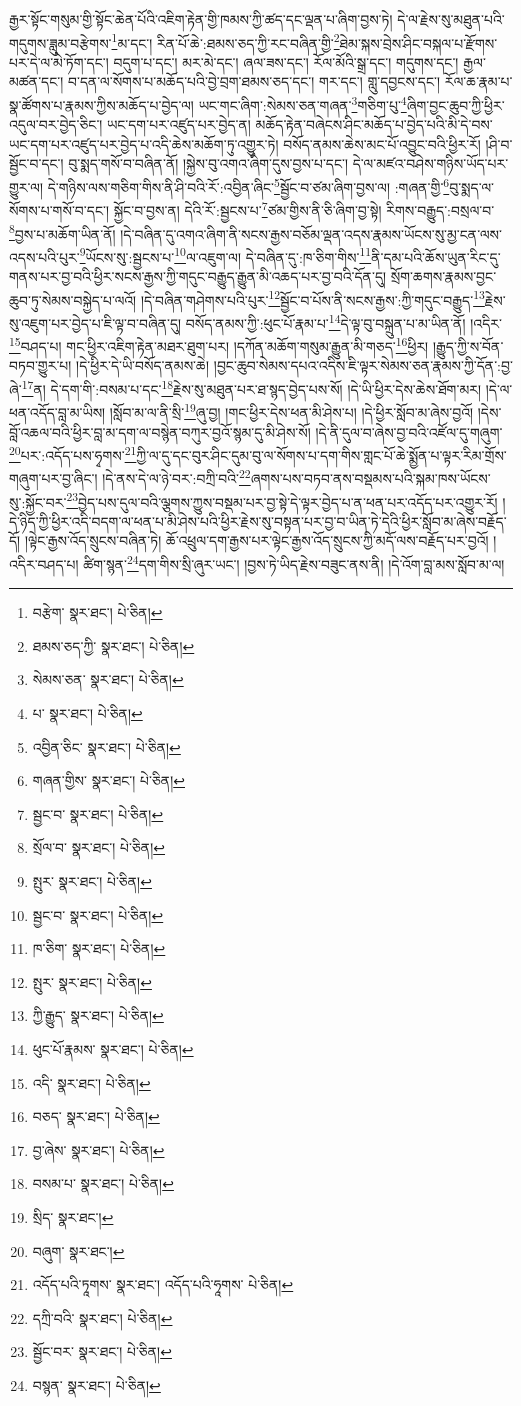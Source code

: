རྒྱར་སྟོང་གསུམ་གྱི་སྟོང་ཆེན་པོའི་འཇིག་རྟེན་གྱི་ཁམས་ཀྱི་ཚད་དང་ལྡན་པ་ཞིག་བྱས་ཏེ། དེ་ལ་རྗེས་སུ་མཐུན་པའི་གདུགས་ཟླུམ་བརྩེགས་\footnote{བརྩེག་  སྣར་ཐང་།  པེ་ཅིན། }མ་དང་། རིན་པོ་ཆེ་:ཐམས་ཅད་ཀྱི་རང་བཞིན་གྱི་\footnote{ཐམས་ཅད་ཀྱི་  སྣར་ཐང་།  པེ་ཅིན། }ཐེམ་སྐས་བྲེས་ཤིང་བསྐལ་པ་རྫོགས་པར་དེ་ལ་མེ་ཏོག་དང་། བདུག་པ་དང་། མར་མེ་དང་། ཞལ་ཟས་དང་། རོལ་མོའི་སྒྲ་དང་། གདུགས་དང་། རྒྱལ་མཚན་དང་། བ་དན་ལ་སོགས་པ་མཆོད་པའི་བྱེ་བྲག་ཐམས་ཅད་དང་། གར་དང་། གླུ་དབྱངས་དང་། རོལ་ཆ་རྣམ་པ་སྣ་ཚོགས་པ་རྣམས་ཀྱིས་མཆོད་པ་བྱེད་ལ། ཡང་གང་ཞིག་:སེམས་ཅན་གཞན་\footnote{སེམས་ཅན་  སྣར་ཐང་།  པེ་ཅིན། }གཅིག་པུ་\footnote{པ་  སྣར་ཐང་།  པེ་ཅིན། }ཞིག་བྱང་ཆུབ་ཀྱི་ཕྱིར་འདུལ་བར་བྱེད་ཅིང་། ཡང་དག་པར་འཛུད་པར་བྱེད་ན། མཆོད་རྟེན་བཞེངས་ཤིང་མཆོད་པ་བྱེད་པའི་མི་དེ་བས་ཡང་དག་པར་འཛུད་པར་བྱེད་པ་འདི་ཆེས་མཆོག་ཏུ་འགྱུར་ཏེ། བསོད་ནམས་ཆེས་མང་པོ་འབྱུང་བའི་ཕྱིར་རོ། །ཤི་བ་སྦྱོང་བ་དང་། བུ་སྨད་གསོ་བ་བཞིན་ནོ། །སྐྱེས་བུ་འགའ་ཞིག་དུས་བྱས་པ་དང་། དེ་ལ་མཛའ་བཤེས་གཉིས་ཡོད་པར་གྱུར་ལ། དེ་གཉིས་ལས་གཅིག་གིས་ནི་ཤི་བའི་རོ་:འབྱིན་ཞིང་\footnote{འབྱིན་ཅིང་  སྣར་ཐང་།  པེ་ཅིན། }སྦྱོང་བ་ཙམ་ཞིག་བྱས་ལ། :གཞན་གྱི་\footnote{གཞན་གྱིས་  སྣར་ཐང་།  པེ་ཅིན། }བུ་སྨད་ལ་སོགས་པ་གསོ་བ་དང་། སྐྱོང་བ་བྱས་ན། དེའི་རོ་:སྦྱངས་པ་\footnote{སྦྱང་བ་  སྣར་ཐང་།  པེ་ཅིན། }ཙམ་གྱིས་ནི་ཅི་ཞིག་བྱ་སྟེ། རིགས་བརྒྱུད་:བསྲལ་བ་\footnote{སྲོལ་བ་  སྣར་ཐང་།  པེ་ཅིན། }བྱས་པ་མཆོག་ཡིན་ནོ། །དེ་བཞིན་དུ་འགའ་ཞིག་ནི་སངས་རྒྱས་བཅོམ་ལྡན་འདས་རྣམས་ཡོངས་སུ་མྱ་ངན་ལས་འདས་པའི་པུར་\footnote{སྤུར་  སྣར་ཐང་།  པེ་ཅིན། }ཡོངས་སུ་:སྦྱངས་པ་\footnote{སྦྱང་བ་  སྣར་ཐང་།  པེ་ཅིན། }ལ་འཇུག་ལ། དེ་བཞིན་དུ་:ཁ་ཅིག་གིས་\footnote{ཁ་ཅིག་  སྣར་ཐང་།  པེ་ཅིན། }ནི་དམ་པའི་ཆོས་ཡུན་རིང་དུ་གནས་པར་བྱ་བའི་ཕྱིར་སངས་རྒྱས་ཀྱི་གདུང་བརྒྱུད་རྒྱུན་མི་འཆད་པར་བྱ་བའི་དོན་དུ། སྲོག་ཆགས་རྣམས་བྱང་ཆུབ་ཏུ་སེམས་བསྐྱེད་པ་ལའོ། །དེ་བཞིན་གཤེགས་པའི་པུར་\footnote{སྤུར་  སྣར་ཐང་།  པེ་ཅིན། }སྦྱོང་བ་པོས་ནི་སངས་རྒྱས་:ཀྱི་གདུང་བརྒྱུད་\footnote{ཀྱི་རྒྱུད་  སྣར་ཐང་།  པེ་ཅིན། }རྗེས་སུ་འཇུག་པར་བྱེད་པ་ཇི་ལྟ་བ་བཞིན་དུ། བསོད་ནམས་ཀྱི་:ཕུང་པོ་རྣམ་པ་\footnote{ཕུང་པོ་རྣམས་  སྣར་ཐང་།  པེ་ཅིན། }དེ་ལྟ་བུ་བསྐྲུན་པ་མ་ཡིན་ནོ། །འདིར་\footnote{འདི་  སྣར་ཐང་།  པེ་ཅིན། }བཤད་པ། གང་ཕྱིར་འཇིག་རྟེན་མཐར་ཐུག་པར། །དཀོན་མཆོག་གསུམ་རྒྱུན་མི་གཅད་\footnote{བཅད་  སྣར་ཐང་།  པེ་ཅིན། }ཕྱིར། །རྒྱུད་ཀྱི་ས་བོན་བཏབ་གྱུར་པ། །དེ་ཕྱིར་དེ་ཡི་བསོད་ནམས་ཆེ། །བྱང་ཆུབ་སེམས་དཔའ་འདིས་ཇི་ལྟར་སེམས་ཅན་རྣམས་ཀྱི་དོན་:བྱ་ཞེ་\footnote{བྱ་ཞེས་  སྣར་ཐང་།  པེ་ཅིན། }ན། དེ་དག་གི་:བསམ་པ་དང་\footnote{བསམ་པ་  སྣར་ཐང་།  པེ་ཅིན། }རྗེས་སུ་མཐུན་པར་ཐ་སྙད་བྱེད་པས་སོ། །དེ་ཡི་ཕྱིར་དེས་ཆེས་ཐོག་མར། །དེ་ལ་ཕན་འདོད་བླ་མ་ཡིས། །སློབ་མ་ལ་ནི་སྲི་\footnote{སྲིད་  སྣར་ཐང་། }ཞུ་བྱ། །གང་ཕྱིར་དེས་ཕན་མི་ཤེས་པ། །དེ་ཕྱིར་སློབ་མ་ཞེས་བྱའོ། །དེས་བློ་འཆལ་བའི་ཕྱིར་བླ་མ་དག་ལ་བསྙེན་བཀུར་བྱའོ་སྙམ་དུ་མི་ཤེས་སོ། །དེ་ནི་དུལ་བ་ཞེས་བྱ་བའི་འཛོལ་དུ་གཞུག་\footnote{བཞུག་  སྣར་ཐང་། }པར་:འདོད་པས་ཧྭགས་\footnote{འདོད་པའི་ཏཱགས་  སྣར་ཐང་། འདོད་པའི་ཧཱགས་  པེ་ཅིན། }ཀྱི་ལ་དུ་དང་བུར་ཤིང་དུམ་བུ་ལ་སོགས་པ་དག་གིས་གླང་པོ་ཆེ་སྨྱོན་པ་ལྟར་རིམ་གྲོས་གཞུག་པར་བྱ་ཞིང་། །དེ་ནས་དེ་ལ་ཉེ་བར་:བཀྲི་བའི་\footnote{དཀྲི་བའི་  སྣར་ཐང་།  པེ་ཅིན། }ཞགས་པས་བཏབ་ནས་བསྡམས་པའི་སྐམ་ཁས་ཡོངས་སུ་:སྐྱོང་བར་\footnote{སྦྱོང་བར་  སྣར་ཐང་།  པེ་ཅིན། }བྱེད་པས་དུལ་བའི་ལྕགས་ཀྱུས་བསྡམ་པར་བྱ་སྟེ་དེ་ལྟར་བྱེད་པ་ན་ཕན་པར་འདོད་པར་འགྱུར་རོ། །དེ་ཉིད་ཀྱི་ཕྱིར་འདི་བདག་ལ་ཕན་པ་མི་ཤེས་པའི་ཕྱིར་རྗེས་སུ་བསྟན་པར་བྱ་བ་ཡིན་ཏེ་དེའི་ཕྱིར་སློབ་མ་ཞེས་བརྗོད་དོ། །ལྟེང་རྒྱས་འོད་སྲུངས་བཞིན་ཏེ། ཆོ་འཕྲུལ་དག་རྒྱས་པར་ལྟེང་རྒྱས་འོད་སྲུངས་ཀྱི་མདོ་ལས་བརྗོད་པར་བྱའོ། །འདིར་བཤད་པ། ཚིག་སྙན་\footnote{བསྙན་  སྣར་ཐང་།  པེ་ཅིན། }དག་གིས་སྲི་ཞུར་ཡང་། །བྱས་ཏེ་ཡིད་རྗེས་བཟུང་ནས་ནི། །དེ་འོག་བླ་མས་སློབ་མ་ལ། 